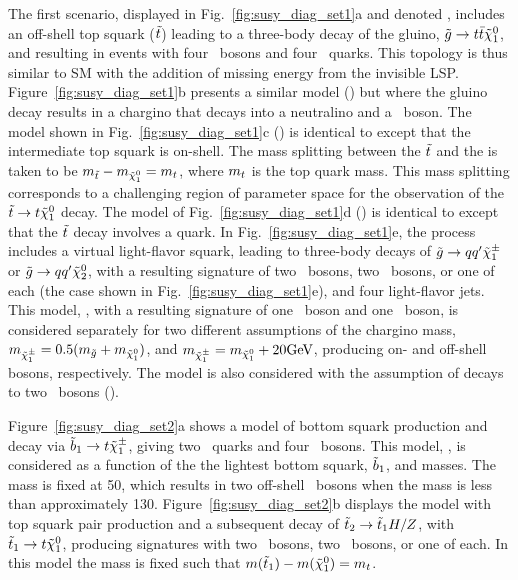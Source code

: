 The first scenario, displayed in Fig.~\ref{fig:susy_diag_set1}a and denoted
\Totttt, includes an off-shell top squark ($\tilde{t}$) leading to a
three-body decay of the gluino, $\tilde{g} \to t\bar{t}\tilde{\chi}_1^0$, and resulting in events
with four \PW\ bosons and four \cPqb\ quarks. This topology is thus similar
to SM \tttt with the addition of missing energy from the invisible LSP.
Figure~\ref{fig:susy_diag_set1}b presents a similar model (\TfttbbWW) but where
the gluino decay results in a chargino that decays into a neutralino
and a \PW\ boson. The model shown in Fig.~\ref{fig:susy_diag_set1}c (\Tftttt)
is identical to \Totttt except that the intermediate top squark is on-shell.
The mass splitting between the $\tilde{t}$ and the \lsp is taken to be
$m_{\tilde{t}} - m_{\tilde{\chi}_1^0} = m_{t}$, where $m_{t}$ is the top quark
mass. This mass splitting corresponds to a challenging region of parameter
space for the observation of the $\tilde{t} \to t \tilde{\chi}_1^0$ decay. The model
of Fig.~\ref{fig:susy_diag_set1}d (\Tfttcc) is identical to 
\Tftttt except that the $\tilde{t}$ decay involves a \PQc quark. In
Fig.~\ref{fig:susy_diag_set1}e, the process includes a virtual
light-flavor squark, leading to three-body decays of $\tilde{g} \to q q'
\tilde{\chi}_1^{\pm}$ or $\tilde{g} \to q q' \tilde{\chi}_2^0$, with a resulting
signature of two \PW\ bosons, two \PZ\ bosons, or one of each (the case shown
in Fig.~\ref{fig:susy_diag_set1}e), and four light-flavor jets. This model,
\TfqqqqWZ, with a resulting signature of one \PW\ boson and one \PZ\ boson,
is considered separately for two different assumptions of the chargino mass,
$m_{\tilde{\chi}_1^{\pm}} = 0.5(m_{\tilde{g}} + m_{\tilde{\chi}_1^0})$, and $m_{\tilde{\chi}_1^{\pm}} =
m_{\tilde{\chi}_1^0}+20 \text{GeV}$, producing on- and off-shell bosons, respectively. The
model is also considered with the assumption of decays to two \PW\ bosons (\TfqqqqWW).

Figure~\ref{fig:susy_diag_set2}a shows a model of bottom squark production and decay
via $\tilde{b}_1 \to t \tilde{\chi}_1^{\pm}$, giving two \cPqb\
quarks and four \PW\ bosons. This model, \TsttWW, is considered as a function
of the the lightest bottom squark, $\tilde{b}_1$, and \chiplmin masses. The
\lsp mass is fixed at 50\GeV, which results in two off-shell \PW\ bosons 
when the \chiplmin mass is less than approximately
130\GeV. Figure~\ref{fig:susy_diag_set2}b displays the \TsttHZ model
with top squark pair production and a subsequent decay of
$\tilde{t}_2\to\tilde{t}_1H/Z$, with $\tilde{t}_1 \to t\tilde{\chi}_1^0$,
producing signatures with two \PH\ bosons, two \PZ\ bosons, or one of each.
In this model the \lsp mass is fixed such that
$m(\tilde{t}_1)-m(\tilde{\chi}_1^0)=m_{t}$.

